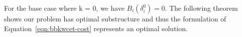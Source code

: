 \noindent
For the base case where $\textrm{k = 0}$, we have $B_{i}(\delta_{i}^{0}) = 0.$  The following theorem shows our problem has optimal substructure and thus the formulation of Equation~\ref{eqn:bbkwcet-cost} represents an optimal solution.

